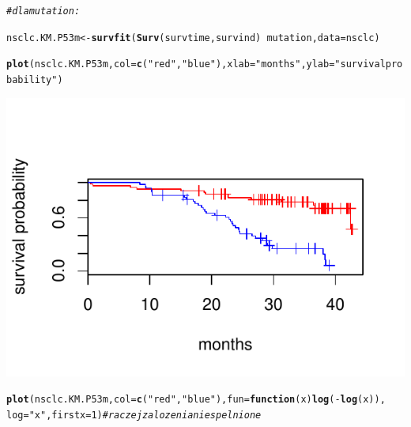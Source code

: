 \documentclass[10pt,a4paper]{article}\usepackage[]{graphicx}\usepackage[]{color}
\makeatletter
\def\maxwidth{ %
  \ifdim\Gin@nat@width>\linewidth
    \linewidth
  \else
    \Gin@nat@width
  \fi
}
\newcommand{\hlnum}[1]{\textcolor[rgb]{0.686,0.059,0.569}{#1}}%
\newcommand{\hlstr}[1]{\textcolor[rgb]{0.192,0.494,0.8}{#1}}%
\newcommand{\hlcom}[1]{\textcolor[rgb]{0.678,0.584,0.686}{\textit{#1}}}%
\newcommand{\hlopt}[1]{\textcolor[rgb]{0,0,0}{#1}}%
\newcommand{\hlstd}[1]{\textcolor[rgb]{0.345,0.345,0.345}{#1}}%
\newcommand{\hlkwa}[1]{\textcolor[rgb]{0.161,0.373,0.58}{\textbf{#1}}}%
\newcommand{\hlkwb}[1]{\textcolor[rgb]{0.69,0.353,0.396}{#1}}%
\newcommand{\hlkwc}[1]{\textcolor[rgb]{0.333,0.667,0.333}{#1}}%
\newcommand{\hlkwd}[1]{\textcolor[rgb]{0.737,0.353,0.396}{\textbf{#1}}}%
\newenvironment{kframe}{%
 \def\at@end@of@kframe{}%
 \ifinner\ifhmode%
  \def\at@end@of@kframe{\end{minipage}}%
  \begin{minipage}{\columnwidth}%
 \fi\fi%
 \def\FrameCommand##1{\hskip\@totalleftmargin \hskip-\fboxsep
 \colorbox{shadecolor}{##1}\hskip-\fboxsep
     \hskip-\linewidth \hskip-\@totalleftmargin \hskip\columnwidth}%
 \MakeFramed {\advance\hsize-\width
   \@totalleftmargin\z@ \linewidth\hsize
   \@setminipage}}%
 {\par\unskip\endMakeFramed%
 \at@end@of@kframe}
\newenvironment{knitrout}{}{} %
\makeatother
\begin{document}
\begin{knitrout}
{}


\begin{kframe}\begin{alltt}
\hlcom{# dla mutation:}

\hlstd{nsclc.KM.P53m} \hlkwb{<-} \hlkwd{survfit}\hlstd{(}\hlkwd{Surv}\hlstd{(survtime, survind)} \hlopt{~} \hlstd{mutation,} \hlkwc{data} \hlstd{= nsclc)}

\hlkwd{plot}\hlstd{(nsclc.KM.P53m,} \hlkwc{col} \hlstd{=} \hlkwd{c}\hlstd{(}\hlstr{"red"}\hlstd{,} \hlstr{"blue"}\hlstd{),} \hlkwc{xlab} \hlstd{=} \hlstr{"months"}\hlstd{,} \hlkwc{ylab} \hlstd{=} \hlstr{"survival probability"}\hlstd{)}
\end{alltt}
\end{kframe}

{\centering \includegraphics[width=\maxwidth]{figure/unnamed-chunk-17} 

}


\begin{kframe}\begin{alltt}
\hlkwd{plot}\hlstd{(nsclc.KM.P53m,} \hlkwc{col} \hlstd{=} \hlkwd{c}\hlstd{(}\hlstr{"red"}\hlstd{,} \hlstr{"blue"}\hlstd{),} \hlkwc{fun} \hlstd{=} \hlkwa{function}\hlstd{(}\hlkwc{x}\hlstd{)} \hlkwd{log}\hlstd{(}\hlopt{-}\hlkwd{log}\hlstd{(x)),}
    \hlkwc{log} \hlstd{=} \hlstr{"x"}\hlstd{,} \hlkwc{firstx} \hlstd{=} \hlnum{1}\hlstd{)}  \hlcom{# raczej zalozenia niespelnione}
\end{alltt}
\end{kframe}


\end{knitrout}
\end{document}
